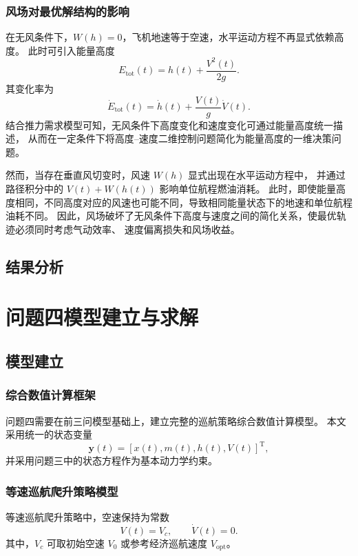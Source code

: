 \documentclass[UTF8]{ctexart}
\begin{document}
\subsubsection{风场对最优解结构的影响}

在无风条件下，$W(h)=0$，飞机地速等于空速，水平运动方程不再显式依赖高度。
此时可引入能量高度\cite{4}
\begin{equation}
    E_{\mathrm{tot}}(t)
    =
    h(t)+\frac{V^2(t)}{2g}.
    \label{eq:q3_energy_height}
\end{equation}
其变化率为
\begin{equation}
    \dot E_{\mathrm{tot}}(t)
    =
    \dot h(t)+\frac{V(t)}{g}\dot V(t).
    \label{eq:q3_Edot}
\end{equation}
结合推力需求模型可知，无风条件下高度变化和速度变化可通过能量高度统一描述，
从而在一定条件下将高度--速度二维控制问题简化为能量高度的一维决策问题。

然而，当存在垂直风切变时，风速 $W(h)$ 显式出现在水平运动方程中，
并通过路径积分中的 $V(t)+W(h(t))$ 影响单位航程燃油消耗。
此时，即使能量高度相同，不同高度对应的风速也可能不同，导致相同能量状态下的地速和单位航程油耗不同。
因此，风场破坏了无风条件下高度与速度之间的简化关系，使最优轨迹必须同时考虑气动效率、
速度偏离损失和风场收益。
\subsection{结果分析}
\section{问题四模型建立与求解}
\subsection{模型建立}
\subsubsection{综合数值计算框架}
问题四需要在前三问模型基础上，建立完整的巡航策略综合数值计算模型。
本文采用统一的状态变量
\[
    \boldsymbol y(t)=\left[x(t),m(t),h(t),V(t)\right]^{\mathrm T},
\]
并采用问题三中的状态方程作为基本动力学约束。\

\subsubsection{等速巡航爬升策略模型}

等速巡航爬升策略中，空速保持为常数
\begin{equation}
    V(t)=V_c,
    \qquad
    \dot V(t)=0.
    \label{eq:q4_const_speed}
\end{equation}
其中，$V_c$ 可取初始空速 $V_0$ 或参考经济巡航速度 $V_{\mathrm{opt}}$。
\end{document}
